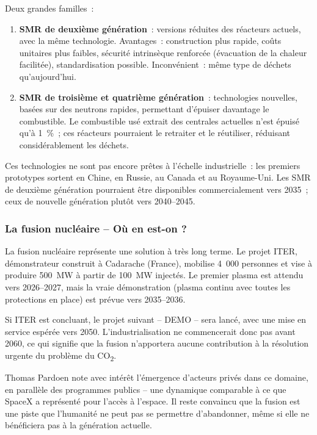 Deux grandes familles~:
\begin{enumerate}
    \item \textbf{SMR de deuxième génération}~: versions réduites des réacteurs actuels, avec la même technologie. Avantages~: construction plus rapide, coûts unitaires plus faibles, sécurité intrinsèque renforcée (évacuation de la chaleur facilitée), standardisation possible. Inconvénient~: même type de déchets qu'aujourd'hui.
    \item \textbf{SMR de troisième et quatrième génération}~: technologies nouvelles, basées sur des neutrons rapides, permettant d'épuiser davantage le combustible. Le combustible usé extrait des centrales actuelles n'est épuisé qu'à 1~\%~; ces réacteurs pourraient le retraiter et le réutiliser, réduisant considérablement les déchets.
\end{enumerate}

Ces technologies ne sont pas encore prêtes à l'échelle industrielle~: les premiers prototypes sortent en Chine, en Russie, au Canada et au Royaume-Uni. Les SMR de deuxième génération pourraient être disponibles commercialement vers 2035~; ceux de nouvelle génération plutôt vers 2040--2045.

\subsubsection{La fusion nucléaire -- Où en est-on ?}

La fusion nucléaire représente une solution à très long terme. Le projet ITER, démonstrateur construit à Cadarache (France), mobilise 4~000 personnes et vise à produire 500~MW à partir de 100~MW injectés. Le premier plasma est attendu vers 2026--2027, mais la vraie démonstration (plasma continu avec toutes les protections en place) est prévue vers 2035--2036.

Si ITER est concluant, le projet suivant -- DEMO -- sera lancé, avec une mise en service espérée vers 2050. L'industrialisation ne commencerait donc pas avant 2060, ce qui signifie que la fusion n'apportera aucune contribution à la résolution urgente du problème du CO\textsubscript{2}.

Thomas Pardoen note avec intérêt l'émergence d'acteurs privés dans ce domaine, en parallèle des programmes publics -- une dynamique comparable à ce que SpaceX a représenté pour l'accès à l'espace. Il reste convaincu que la fusion est une piste que l'humanité ne peut pas se permettre d'abandonner, même si elle ne bénéficiera pas à la génération actuelle.

